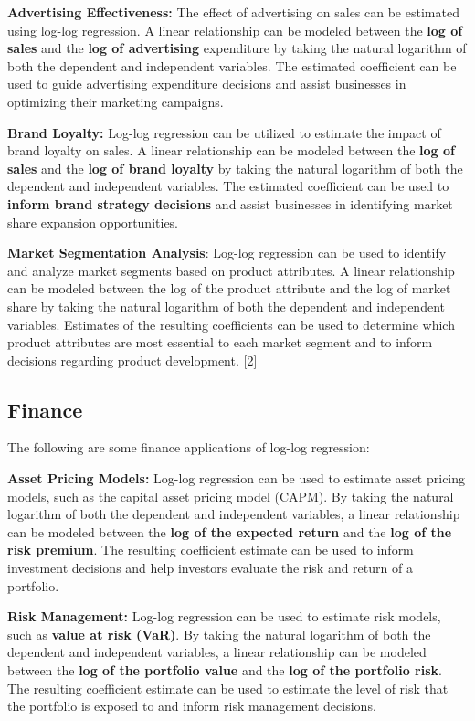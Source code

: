 \documentclass[
  letterpaper,
  DIV=11,
  numbers=noendperiod]{scrreport}
\begin{document}
\textbf{Advertising Effectiveness:} The effect of advertising on sales
can be estimated using log-log regression. A linear relationship can be
modeled between the \textbf{log of sales} and the \textbf{log of
advertising} expenditure by taking the natural logarithm of both the
dependent and independent variables. The estimated coefficient can be
used to guide advertising expenditure decisions and assist businesses in
optimizing their marketing campaigns.

\textbf{Brand Loyalty:} Log-log regression can be utilized to estimate
the impact of brand loyalty on sales. A linear relationship can be
modeled between the \textbf{log of sales} and the \textbf{log of brand
loyalty} by taking the natural logarithm of both the dependent and
independent variables. The estimated coefficient can be used to
\textbf{inform brand strategy decisions} and assist businesses in
identifying market share expansion opportunities.

\textbf{Market Segmentation Analysis}: Log-log regression can be used to
identify and analyze market segments based on product attributes. A
linear relationship can be modeled between the log of the product
attribute and the log of market share by taking the natural logarithm of
both the dependent and independent variables. Estimates of the resulting
coefficients can be used to determine which product attributes are most
essential to each market segment and to inform decisions regarding
product development. {[}2{]}

\subsection{Finance}\label{finance}

The following are some finance applications of log-log regression:

\textbf{Asset Pricing Models:} Log-log regression can be used to
estimate asset pricing models, such as the capital asset pricing model
(CAPM). By taking the natural logarithm of both the dependent and
independent variables, a linear relationship can be modeled between the
\textbf{log of the expected return} and the \textbf{log of the risk
premium}. The resulting coefficient estimate can be used to inform
investment decisions and help investors evaluate the risk and return of
a portfolio.

\textbf{Risk Management:} Log-log regression can be used to estimate
risk models, such as \textbf{value at risk (VaR)}. By taking the natural
logarithm of both the dependent and independent variables, a linear
relationship can be modeled between the \textbf{log of the portfolio
value} and the \textbf{log of the portfolio risk}. The resulting
coefficient estimate can be used to estimate the level of risk that the
portfolio is exposed to and inform risk management decisions.
\end{document}
